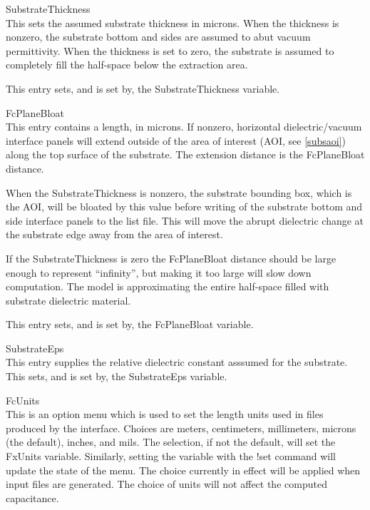 \begin{description}
\item{\cb SubstrateThickness}\\
This sets the assumed substrate thickness in microns.  When the
thickness is nonzero, the substrate bottom and sides are assumed to
abut vacuum permittivity.  When the thickness is set to zero, the
substrate is assumed to completely fill the half-space below the
extraction area.

This entry sets, and is set by, the {\et SubstrateThickness} variable.

\item{\cb FcPlaneBloat}\\
This entry contains a length, in microns.  If nonzero, horizontal
dielectric/vacuum interface panels will extend outside of the area of
interest (AOI, see \ref{subsaoi}) along the top surface of the
substrate.  The extension distance is the {\et FcPlaneBloat} distance.

When the {\et SubstrateThickness} is nonzero, the substrate bounding
box, which is the AOI, will be bloated by this value before writing of
the substrate bottom and side interface panels to the list file.  This
will move the abrupt dielectric change at the substrate edge away from
the area of interest.

If the {\et SubstrateThickness} is zero the {\et FcPlaneBloat}
distance should be large enough to represent ``infinity'', but making
it too large will slow down computation.  The model is approximating
the entire half-space filled with substrate dielectric material. 

This entry sets, and is set by, the {\et FcPlaneBloat} variable.

\item{\cb SubstrateEps}\\
This entry supplies the relative dielectric constant asssumed for the
substrate.  This sets, and is set by, the {\et SubstrateEps} variable.

\item{\cb FcUnits}\\
This is an option menu which is used to set the length units used in
files produced by the interface.  Choices are meters, centimeters,
millimeters, microns (the default), inches, and mils.  The selection,
if not the default, will set the {\et FxUnits} variable.  Similarly,
setting the variable with the {\cb !set} command will update the state
of the menu.  The choice currently in effect will be applied when
input files are generated.  The choice of units will not affect the
computed capacitance.
\end{description}

